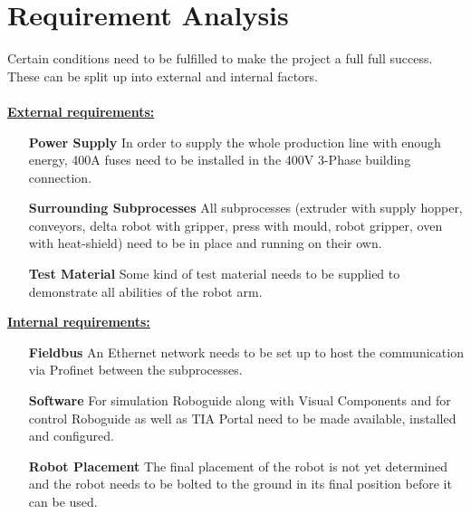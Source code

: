 
\chapter{Requirement Analysis}

Certain conditions need to be fulfilled to make the project a full full success. 
These can be split up into external and internal factors.\\
\\
\underline{\textbf{External requirements:}}\vspace{2mm}
\begin{itemize}[leftmargin=5cm]
	\item[\textbf{Power Supply}] In order to supply the whole production line with enough energy, 400A fuses need to be installed in the 400V 3-Phase building connection.
	\item[\textbf{Surrounding Subprocesses}] All subprocesses (extruder with supply hopper, conveyors, delta robot with gripper, press with mould, robot gripper, oven with heat-shield) need to be in place and running on their own.
	\item[\textbf{Test Material}] Some kind of test material needs to be supplied to demonstrate all abilities of the robot arm.
\end{itemize}
\bigskip
\underline{\textbf{Internal requirements:}}\vspace{2mm}
\begin{itemize}[leftmargin=5cm]
	\item[\textbf{Fieldbus}] An Ethernet network needs to be set up to host the communication via Profinet between the subprocesses.
	\item[\textbf{Software}] For simulation Roboguide along with Visual Components and for control Roboguide as well as TIA Portal need to be made available, installed and configured. 
	\item[\textbf{Robot Placement}] The final placement of the robot is not yet determined and the robot needs to be bolted to the ground in its final position before it can be used.
\end{itemize}
\bigskip

